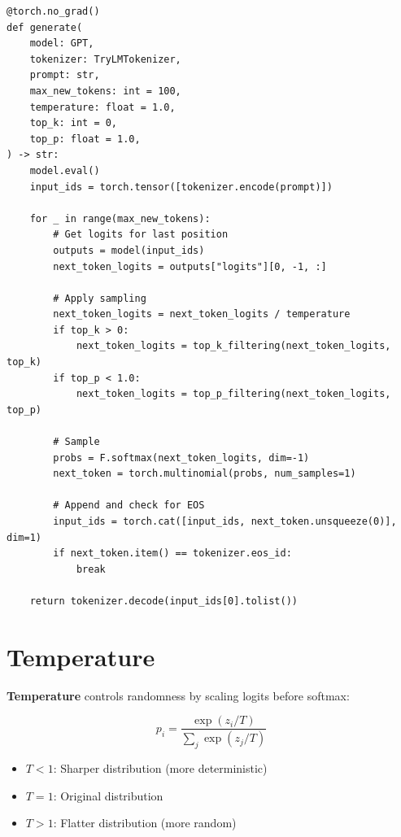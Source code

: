 \begin{lstlisting}[style=python, caption={Core generation loop from generate.py}]
@torch.no_grad()
def generate(
    model: GPT,
    tokenizer: TryLMTokenizer,
    prompt: str,
    max_new_tokens: int = 100,
    temperature: float = 1.0,
    top_k: int = 0,
    top_p: float = 1.0,
) -> str:
    model.eval()
    input_ids = torch.tensor([tokenizer.encode(prompt)])

    for _ in range(max_new_tokens):
        # Get logits for last position
        outputs = model(input_ids)
        next_token_logits = outputs["logits"][0, -1, :]

        # Apply sampling
        next_token_logits = next_token_logits / temperature
        if top_k > 0:
            next_token_logits = top_k_filtering(next_token_logits, top_k)
        if top_p < 1.0:
            next_token_logits = top_p_filtering(next_token_logits, top_p)

        # Sample
        probs = F.softmax(next_token_logits, dim=-1)
        next_token = torch.multinomial(probs, num_samples=1)

        # Append and check for EOS
        input_ids = torch.cat([input_ids, next_token.unsqueeze(0)], dim=1)
        if next_token.item() == tokenizer.eos_id:
            break

    return tokenizer.decode(input_ids[0].tolist())
\end{lstlisting}

\section{Temperature}

\textbf{Temperature} controls randomness by scaling logits before softmax:

\begin{equation}
p_i = \frac{\exp(z_i / T)}{\sum_j \exp(z_j / T)}
\end{equation}

\begin{itemize}
    \item $T < 1$: Sharper distribution (more deterministic)
    \item $T = 1$: Original distribution
    \item $T > 1$: Flatter distribution (more random)
\end{itemize}

